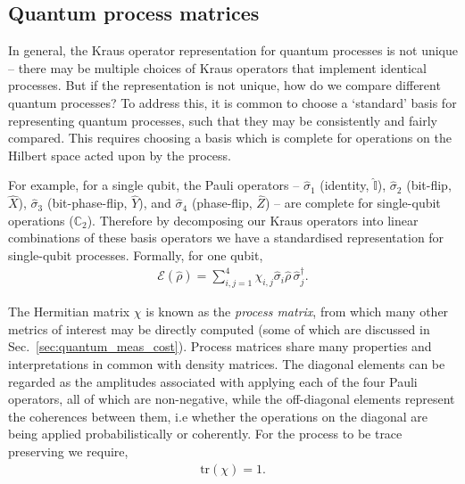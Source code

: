 \documentclass[aps, rmp, twocolumn, amsmath, amssymb, nofootinbib, superscriptaddress, longbibliography, floatfix, table-of-contents, eqsecnum]{revtex4-1}
\begin{document}
%
%

\subsection{Quantum process matrices} 

In general, the Kraus operator representation for quantum processes is not unique -- there may be multiple choices of Kraus operators that implement identical processes. But if the representation is not unique, how do we compare different quantum processes? To address this, it is common to choose a `standard' basis for representing quantum processes, such that they may be consistently and fairly compared. This requires choosing a basis which is complete for operations on the Hilbert space acted upon by the process.

For example, for a single qubit, the Pauli operators -- $\hat\sigma_1$ (identity, $\mathbb{\hat{I}}$), $\hat\sigma_2$ (bit-flip, $\hat{X}$), $\hat\sigma_3$ (bit-phase-flip, $\hat{Y}$), and $\hat\sigma_4$ (phase-flip, $\hat{Z}$) -- are complete for single-qubit operations ($\mathbb{C}_2$). Therefore by decomposing our Kraus operators into linear combinations of these basis operators we have a standardised representation for single-qubit processes. Formally, for one qubit,
\begin{align} \label{eq:process_matrix}
\mathcal{E}(\hat\rho) = \sum_{i,j=1}^4 \chi_{i,j} \hat{\sigma}_i\hat\rho\,\hat{\sigma}_j^\dag.
\end{align}

The Hermitian matrix $\chi$ is known as the \textit{process matrix}, from which many other metrics of interest may be directly computed (some of which are discussed in Sec.~\ref{sec:quantum_meas_cost}). Process matrices share many properties and interpretations in common with density matrices. The diagonal elements can be regarded as the amplitudes associated with applying each of the four Pauli operators, all of which are non-negative, while the off-diagonal elements represent the coherences between them, i.e whether the operations on the diagonal are being applied probabilistically or coherently. For the process to be trace preserving we require,
\begin{align}
\text{tr}(\chi) = 1.
\end{align}
\end{document}
